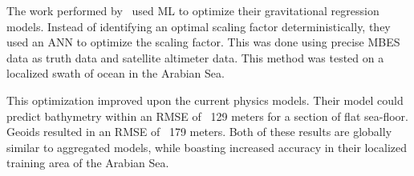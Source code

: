 \par
The work performed by~\cite{jena2012prediction} used \ac{ML} to optimize their gravitational regression models.
Instead of identifying an optimal scaling factor deterministically, they used an \ac{ANN} to optimize the scaling factor.
This was done using precise \ac{MBES} data as truth data and satellite altimeter data.
This method was tested on a localized swath of ocean in the Arabian Sea.

\par
This optimization improved upon the current physics models.
Their model could predict bathymetry within an \ac{RMSE} of ~129 meters for a section of flat sea-floor.
Geoids resulted in an \ac{RMSE} of ~179 meters.
Both of these results are globally similar to aggregated models, while boasting increased accuracy in their localized training area of the Arabian Sea.

